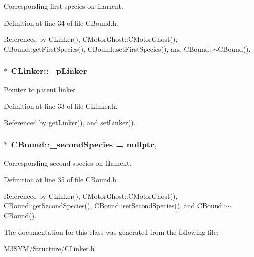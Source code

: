 Corresponding first species on filament. 



Definition at line 34 of file C\+Bound.\+h.



Referenced by C\+Linker(), C\+Motor\+Ghost\+::\+C\+Motor\+Ghost(), C\+Bound\+::get\+First\+Species(), C\+Bound\+::set\+First\+Species(), and C\+Bound\+::$\sim$\+C\+Bound().

\hypertarget{classCLinker_a5cb1a9ff49e6d394ab980ff01af23ebc}{
\subsubsection[{\+\_\+p\+Linker}]{$\ast$ C\+Linker\+::\+\_\+p\+Linker\hspace{0.3cm}{\ttfamily [private]}}}\label{classCLinker_a5cb1a9ff49e6d394ab980ff01af23ebc}


Pointer to parent linker. 



Definition at line 33 of file C\+Linker.\+h.



Referenced by get\+Linker(), and set\+Linker().

\hypertarget{classCBound_ae6818ab861d273598a2507be75183e41}{
\subsubsection[{\+\_\+second\+Species}]{$\ast$ C\+Bound\+::\+\_\+second\+Species = nullptr\hspace{0.3cm}{\ttfamily [protected]}, {\ttfamily [inherited]}}}\label{classCBound_ae6818ab861d273598a2507be75183e41}


Corresponding second species on filament. 



Definition at line 35 of file C\+Bound.\+h.



Referenced by C\+Linker(), C\+Motor\+Ghost\+::\+C\+Motor\+Ghost(), C\+Bound\+::get\+Second\+Species(), C\+Bound\+::set\+Second\+Species(), and C\+Bound\+::$\sim$\+C\+Bound().



The documentation for this class was generated from the following file\+:\begin{DoxyCompactItemize}
\item 
M3\+S\+Y\+M/\+Structure/\hyperlink{CLinker_8h}{C\+Linker.\+h}\end{DoxyCompactItemize}
